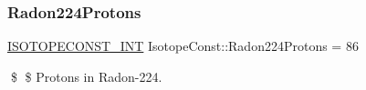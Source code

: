 \subsubsection{\texorpdfstring{Radon224\+Protons}{Radon224Protons}}
{\footnotesize\ttfamily \mbox{\hyperlink{group___isotope_const-_macros_ga5f18360b3e99483a35c32d789e62621c}{I\+S\+O\+T\+O\+P\+E\+C\+O\+N\+S\+T\+\_\+\+I\+NT}} Isotope\+Const\+::\+Radon224\+Protons = 86}

\$ \$ Protons in Radon-\/224. 